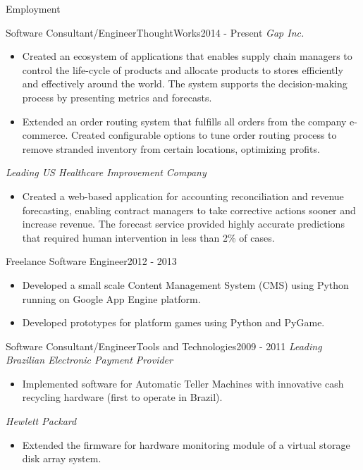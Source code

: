 \documentclass[]{customresume}
\begin{document}
	\makeheader
	\begin{cvsection}{Employment}
    \begin{cvsubsection}{Software Consultant/Engineer}{ThoughtWorks}{2014 - Present}
      \textit{Gap Inc.}
			\begin{itemize}
				\item Created an ecosystem of applications that enables supply chain managers to control the life-cycle of products and allocate products 
          to stores efficiently and effectively around the world. The system supports the decision-making process by presenting metrics and forecasts. 
				\item Extended an order routing system that fulfills all orders from the company e-commerce. Created configurable options to tune order routing 
          process to remove stranded inventory from certain locations, optimizing profits.
			\end{itemize}
      \vspace{5pt}
      \textit{Leading US Healthcare Improvement Company}
      \begin{itemize}
        \item Created a web-based application for accounting reconciliation and revenue forecasting, enabling contract managers to take corrective actions
          sooner and increase revenue. The forecast service provided highly accurate predictions that required human intervention in less than 2\% of cases.
      \end{itemize}
		\end{cvsubsection}
		
		\begin{cvsubsection}{Freelance Software Engineer}{}{2012 - 2013}	
			\begin{itemize}
        \item Developed a small scale Content Management System (CMS) using Python running on Google App Engine platform.
				\item Developed prototypes for platform games using Python and PyGame.
			\end{itemize}
		\end{cvsubsection}
		
		\begin{cvsubsection}{Software Consultant/Engineer}{Tools and Technologies}{2009 - 2011}		
      \textit{Leading Brazilian Electronic Payment Provider}
			\begin{itemize}
        \item Implemented software for Automatic Teller Machines with innovative cash recycling hardware (first to operate in Brazil). 
			\end{itemize}
      \vspace{5pt}
      \textit{Hewlett Packard}
      \begin{itemize}
				\item Extended the firmware for hardware monitoring module of a virtual storage disk array system.
      \end{itemize}
		\end{cvsubsection}
		

\end{cvsection}
\end{document}
